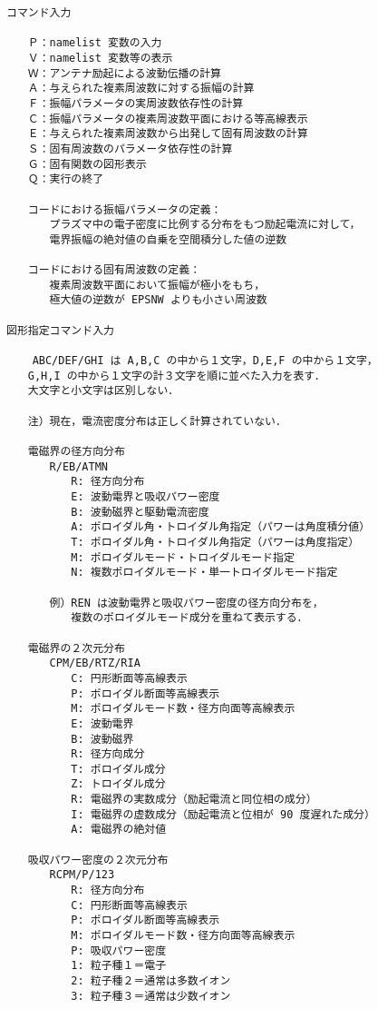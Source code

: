 \documentclass[11pt]{jarticle}
\begin{document}
\begin{verbatim}
コマンド入力

　　Ｐ：namelist 変数の入力
　　Ｖ：namelist 変数等の表示
　　Ｗ：アンテナ励起による波動伝播の計算
　　Ａ：与えられた複素周波数に対する振幅の計算
　　Ｆ：振幅パラメータの実周波数依存性の計算
　　Ｃ：振幅パラメータの複素周波数平面における等高線表示
　　Ｅ：与えられた複素周波数から出発して固有周波数の計算
　　Ｓ：固有周波数のパラメータ依存性の計算
　　Ｇ：固有関数の図形表示
　　Ｑ：実行の終了

　　コードにおける振幅パラメータの定義：
　　　　プラズマ中の電子密度に比例する分布をもつ励起電流に対して，
　　　　電界振幅の絶対値の自乗を空間積分した値の逆数

　　コードにおける固有周波数の定義：
　　　　複素周波数平面において振幅が極小をもち，
　　　　極大値の逆数が EPSNW よりも小さい周波数

図形指定コマンド入力

    ABC/DEF/GHI は A,B,C の中から１文字，D,E,F の中から１文字，
　　G,H,I の中から１文字の計３文字を順に並べた入力を表す．
　　大文字と小文字は区別しない．

　　注）現在，電流密度分布は正しく計算されていない．

　　電磁界の径方向分布
　　　　R/EB/ATMN
　　　　　　R: 径方向分布
　　　　　　E: 波動電界と吸収パワー密度
　　　　　　B: 波動磁界と駆動電流密度
　　　　　　A: ポロイダル角・トロイダル角指定（パワーは角度積分値）
　　　　　　T: ポロイダル角・トロイダル角指定（パワーは角度指定）
　　　　　　M: ポロイダルモード・トロイダルモード指定
　　　　　　N: 複数ポロイダルモード・単一トロイダルモード指定

　　　　例）REN は波動電界と吸収パワー密度の径方向分布を，
　　　　　　複数のポロイダルモード成分を重ねて表示する．

　　電磁界の２次元分布
　　　　CPM/EB/RTZ/RIA
　　　　　　C: 円形断面等高線表示
　　　　　　P: ポロイダル断面等高線表示
　　　　　　M: ポロイダルモード数・径方向面等高線表示
　　　　　　E: 波動電界
　　　　　　B: 波動磁界
　　　　　　R: 径方向成分
　　　　　　T: ポロイダル成分
　　　　　　Z: トロイダル成分
　　　　　　R: 電磁界の実数成分（励起電流と同位相の成分）
　　　　　　I: 電磁界の虚数成分（励起電流と位相が 90 度遅れた成分）
　　　　　　A: 電磁界の絶対値

　　吸収パワー密度の２次元分布
　　　　RCPM/P/123
　　　　　　R: 径方向分布
　　　　　　C: 円形断面等高線表示
　　　　　　P: ポロイダル断面等高線表示
　　　　　　M: ポロイダルモード数・径方向面等高線表示
　　　　　　P: 吸収パワー密度
　　　　　　1: 粒子種１＝電子
　　　　　　2: 粒子種２＝通常は多数イオン
　　　　　　3: 粒子種３＝通常は少数イオン


\end{verbatim}
\end{document}
